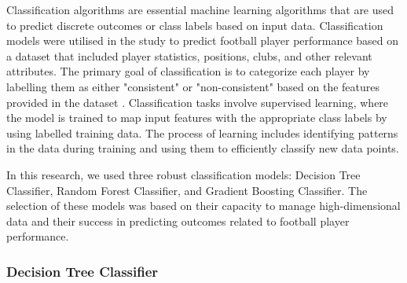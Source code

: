 \documentclass[12pt, a4paper,oneside]{book}
\numberwithin{equation}{section}
\begin{document}
Classification algorithms are essential machine learning algorithms that are used to predict discrete outcomes or class labels based on input data. Classification models were utilised in the study to predict football player performance based on a dataset that included player statistics, positions, clubs, and other relevant attributes. The primary goal of classification is to categorize each player by labelling them as either "consistent" or "non-consistent" based on the features provided in the dataset \cite{alpaydin2020}. Classification tasks involve supervised learning, where the model is trained to map input features with the appropriate class labels by using labelled training data. The process of learning includes identifying patterns in the data during training and using them to efficiently classify new data points.

In this research, we used three robust classification models: Decision Tree Classifier, Random Forest Classifier, and Gradient Boosting Classifier. The selection of these models was based on their capacity to manage high-dimensional data and their success in predicting outcomes related to football player performance.


\subsubsection{Decision Tree Classifier}
\end{document}
